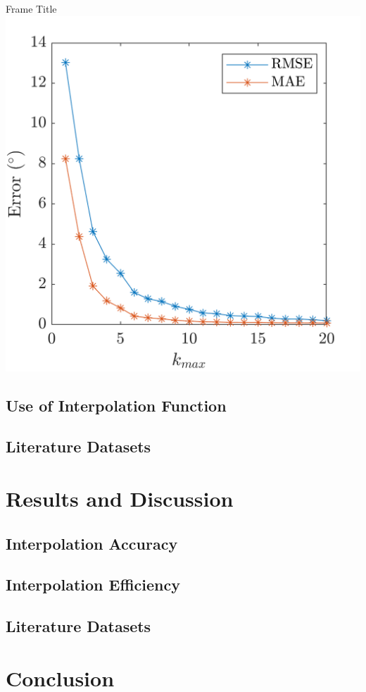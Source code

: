 \documentclass{beamer}
\begin{document}
\begin{frame}{Frame Title}
\centering
\includegraphics[height=0.85\textheight]{figures/dist-ensemble-rmse-mae.png}
\end{frame}

\subsection{Use of Interpolation Function}

\subsection{Literature Datasets}

\section{Results and Discussion}

\subsection{Interpolation Accuracy}

\subsection{Interpolation Efficiency}

\subsection{Literature Datasets}

\section{Conclusion}
\end{document}
